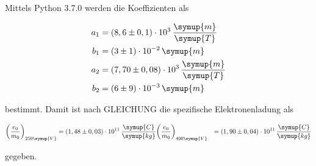 Mittels Python 3.7.0 werden die Koeffizienten als

\begin{align*}
  a_1 &= (8,6 \pm 0,1) \cdot 10^{3} \, \frac{\symup{m}}{\symup{T}} \\
  b_1 &= (3 \pm 1) \cdot 10^{-2} \, \symup{m} \\
  a_2 &= (7,70 \pm 0,08) \cdot 10^{3} \, \frac{\symup{m}}{\symup{T}} \\
  b_2 &= (6 \pm 9) \cdot 10^{-3} \, \symup{m}
\end{align*}

bestimmt.
Damit ist nach GLEICHUNG die spezifische Elektronenladung als 

\begin{align*}
  \bigg( \frac{e_0}{m_0} \bigg)_{250 \symup{V}} &= (1,48 \pm 0,03) \cdot 10^{11} \, \frac{\symup{C}}{\symup{kg}}
  \bigg( \frac{e_0}{m_0} \bigg)_{400 \symup{V}} &= (1,90 \pm 0,04) \cdot 10^{11} \, \frac{\symup{C}}{\symup{kg}}
\end{align*}

gegeben.